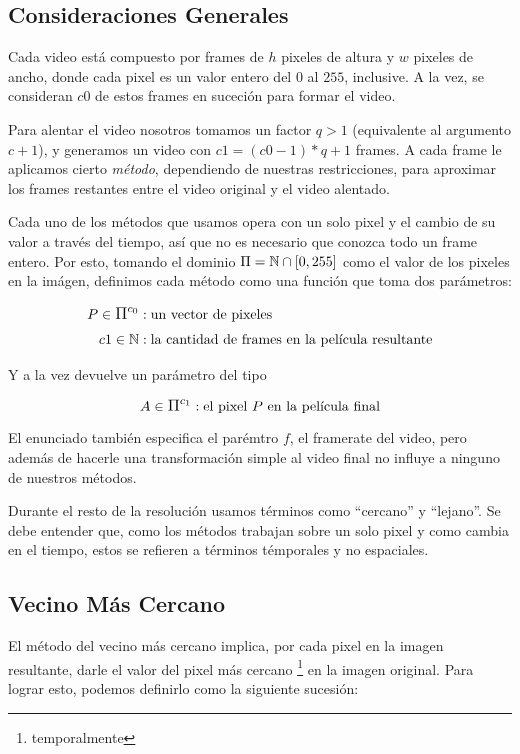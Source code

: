 \subsection{Consideraciones Generales}

Cada video est\'a compuesto por frames de $h$ pixeles de altura y $w$ pixeles de
ancho, donde cada pixel es un valor entero del $0$ al $255$, inclusive. A la
vez, se consideran $c0$ de estos frames en suceci\'on para formar el video.

Para alentar el video nosotros tomamos un factor $q > 1$ (equivalente al
argumento $c + 1$), y generamos un video con $c1 = (c0 - 1) * q + 1$ frames. A cada frame
le aplicamos cierto \textit{m\'etodo}, dependiendo de nuestras restricciones,
para aproximar los frames restantes entre el video original y el video alentado.

Cada uno de los m\'etodos que usamos opera con un solo pixel y el cambio de su
valor a trav\'es del tiempo, as\'i que no es necesario que conozca todo un frame
entero. Por esto, tomando el dominio $\mathlarger{\Pi} = \mathbb{N} \cap \left[ 0, 255
\right]$ como el valor de los pixeles en la im\'agen, definimos cada m\'etodo
como una funci\'on que toma dos par\'ametros:

\[
\begin{split}
P \in \mathlarger{\Pi^{c_0}} & : \text{un vector de pixeles} \\
c1 \in \mathbb{N} & : \text{la cantidad de frames en la pel\'icula resultante}
\end{split}
\]

Y a la vez devuelve un par\'ametro del tipo

\[
A \in \mathlarger{\Pi^{c_1}} : \text{el pixel $P$ en la pel\'icula final}
\]

El enunciado tambi\'en especifica el par\'emtro $f$, el framerate del video,
pero adem\'as de hacerle una transformaci\'on simple al video final no influye a
ninguno de nuestros m\'etodos.

Durante el resto de la resoluci\'on usamos t\'erminos como ``cercano'' y
``lejano''. Se debe entender que, como los m\'etodos trabajan sobre un solo
pixel y como cambia en el tiempo, estos se refieren a t\'erminos t\'emporales y
no espaciales.

\subsection{Vecino M\'as Cercano}

El m\'etodo del vecino m\'as cercano implica, por cada pixel en la imagen
resultante, darle el valor del pixel m\'as cercano \footnote{temporalmente} en
la imagen original. Para lograr esto, podemos definirlo como la siguiente
sucesi\'on:

